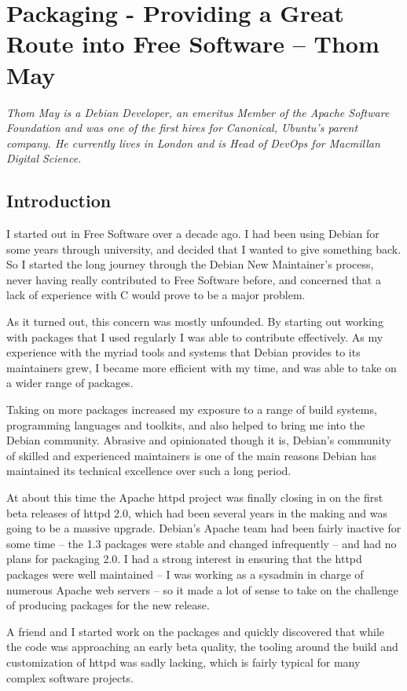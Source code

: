 \chapter{Packaging - Providing a Great Route into Free Software -- Thom May}

\textit{Thom May is a Debian Developer, an emeritus Member of the Apache
Software Foundation and was one of the first hires for Canonical, Ubuntu's
parent company. He currently lives in London and is Head of DevOps for Macmillan
Digital Science.}

\section*{Introduction}
I started out in Free Software over a decade ago. I had been using Debian for
some years through university, and decided that I wanted to give something back.
So I started the long journey through the Debian New Maintainer's process, never
having really contributed to Free Software before, and concerned that a lack of
experience with C would prove to be a major problem.

As it turned out, this concern was mostly unfounded. By starting out working
with packages that I used regularly I was able to contribute effectively. As my
experience with the myriad tools and systems that Debian provides to its
maintainers grew, I became more efficient with my time, and was able to take on
a wider range of packages. 

Taking on more packages increased my exposure to a range of build systems,
programming languages and toolkits, and also helped to bring me into the Debian
community. Abrasive and opinionated though it is, Debian's community of skilled
and experienced maintainers is one of the main reasons Debian has maintained its
technical excellence over such a long period.

At about this time the Apache httpd project was finally closing in on the first
beta releases of httpd 2.0, which had been several years in the making and was
going to be a massive upgrade. Debian's Apache team had been fairly inactive for
some time -- the 1.3 packages were stable and changed infrequently -- and had no
plans for packaging 2.0. 
I had a strong interest in ensuring that the httpd packages were well maintained
-- I was working as a sysadmin in charge of numerous Apache web servers -- so it
made a lot of sense to take on the challenge of producing packages for the new
release. 

A friend and I started work on the packages and quickly discovered that while
the code was approaching an early beta quality, the tooling around the build and
customization of httpd was sadly lacking, which is fairly typical for many
complex software projects. 

